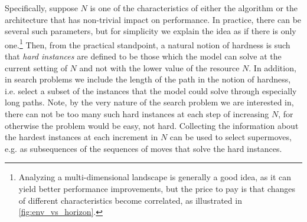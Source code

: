 Specifically, suppose $N$ is one of the characteristics of either the algorithm or the architecture that has non-trivial impact on performance. In practice, there can be several such parameters, but for simplicity we explain the idea as if there is only one.\footnote{Analyzing a multi-dimensional landscape is generally a good idea, as it can yield better performance improvements, but the price to pay is that changes of different characteristics become correlated, as illustrated in \autoref{fig:env_vs_horizon}.} Then, from the practical standpoint, a natural notion of hardness is such that \textit{hard instances} are defined to be those which the model can solve at the current setting of $N$ and not with the lower value of the resource $N$. In addition, in search problems we include the length of the path in the notion of hardness, i.e. select a subset of the instances that the model could solve through especially long paths. Note, by the very nature of the search problem we are interested in, there can not be too many such hard instances at each step of increasing $N$, for otherwise the problem would be easy, not hard. Collecting the information about the hardest instances at each increment in $N$ can be used to select supermoves, e.g. as subsequences of the sequences of moves that solve the hard instances.

